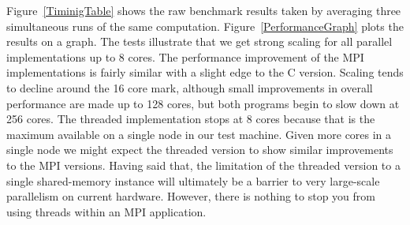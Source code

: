 \documentclass{tmr}
\begin{document}


Figure~\ref{TiminigTable} shows the raw benchmark results taken by averaging three
simultaneous runs of the same computation. Figure~\ref{PerformanceGraph}
plots the results on a graph. The tests illustrate that we get strong scaling
for all parallel implementations up to 8 cores. The performance improvement of
the MPI implementations is fairly similar with
a slight edge to the C version. Scaling tends to decline around
the 16 core mark, although small improvements in overall performance are made up to
128 cores, but both programs begin to slow down at 256 cores.
The threaded implementation stops at 8 cores because that is the maximum available
on a single node in our test machine.
Given more cores in a single node we might expect the threaded version to
show similar improvements to the MPI versions. Having said that, the limitation
of the threaded version to a single shared-memory instance will ultimately be
a barrier to very large-scale parallelism on current hardware.
However, there is nothing to stop you from using threads within an MPI application.
\end{document}
